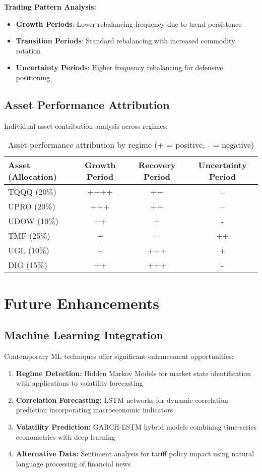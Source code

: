 \documentclass[onecolumn,ieee]{arithmaxresearch}
\begin{document}
\textbf{Trading Pattern Analysis:}
\begin{itemize}
    \item \textbf{Growth Periods}: Lower rebalancing frequency due to trend persistence
    \item \textbf{Transition Periods}: Standard rebalancing with increased commodity rotation
    \item \textbf{Uncertainty Periods}: Higher frequency rebalancing for defensive positioning
\end{itemize}

\subsection{Asset Performance Attribution}

Individual asset contribution analysis across regimes:

\begin{table}[h]
\centering
\begin{tabular}{lccc}
\toprule
\textbf{Asset (Allocation)} & \textbf{Growth Period} & \textbf{Recovery Period} & \textbf{Uncertainty Period} \\
\midrule
TQQQ (20\%) & ++++ & ++ & - \\
UPRO (20\%) & +++ & ++ & -- \\
UDOW (10\%) & ++ & + & - \\
TMF (25\%) & + & - & ++ \\
UGL (10\%) & + & +++ & + \\
DIG (15\%) & ++ & +++ & - \\
\bottomrule
\end{tabular}
\caption{Asset performance attribution by regime (+ = positive, - = negative)}
\end{table}

\section{Future Enhancements}

\subsection{Machine Learning Integration}

Contemporary ML techniques offer significant enhancement opportunities:
\begin{enumerate}
    \item \textbf{Regime Detection:} Hidden Markov Models for market state identification with applications to volatility forecasting
    \item \textbf{Correlation Forecasting:} LSTM networks for dynamic correlation prediction incorporating macroeconomic indicators
    \item \textbf{Volatility Prediction:} GARCH-LSTM hybrid models combining time-series econometrics with deep learning
    \item \textbf{Alternative Data:} Sentiment analysis for tariff policy impact using natural language processing of financial news
\end{enumerate}
\end{document}
